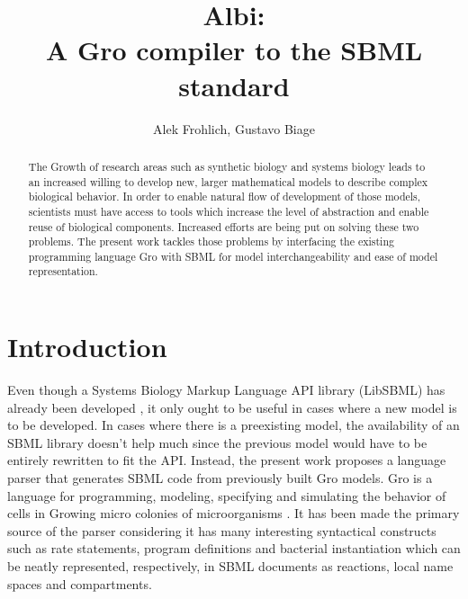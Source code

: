 \documentclass[12pt]{article}
\title{Albi:\\ A Gro compiler to the SBML standard}
\author{Alek Frohlich\inst{1}, Gustavo Biage\inst{1}}
\begin{document}
\maketitle

\begin{abstract}


    The Growth of research areas such as synthetic biology and systems biology leads to an increased willing to develop new, larger mathematical models to describe complex biological behavior. In order to enable natural flow of development of those models, scientists must have access to tools which increase the level of abstraction and enable reuse of biological components. Increased efforts are being put on solving these two problems. The present work tackles those problems by interfacing the existing programming language Gro with SBML for model interchangeability and ease of model representation.


\end{abstract}

\section{Introduction}


    Even though a Systems Biology Markup Language API library (LibSBML) has already been developed \cite{Bornstein2008}, it only ought to be useful in cases where a new model is to be developed. In cases where there is a preexisting model, the availability of an SBML library doesn't help much since the previous model would have to be entirely rewritten to fit the API. Instead, the present work proposes a language parser that generates SBML code from previously built Gro models. Gro is a language for programming, modeling, specifying and simulating the behavior of cells in Growing micro colonies of microorganisms \cite{Jang2012}. It has been made the primary source of the parser considering it has many interesting syntactical constructs such as rate statements, program definitions and bacterial instantiation which can be neatly represented, respectively, in SBML documents as reactions, local name spaces and compartments.
    
\end{document}

